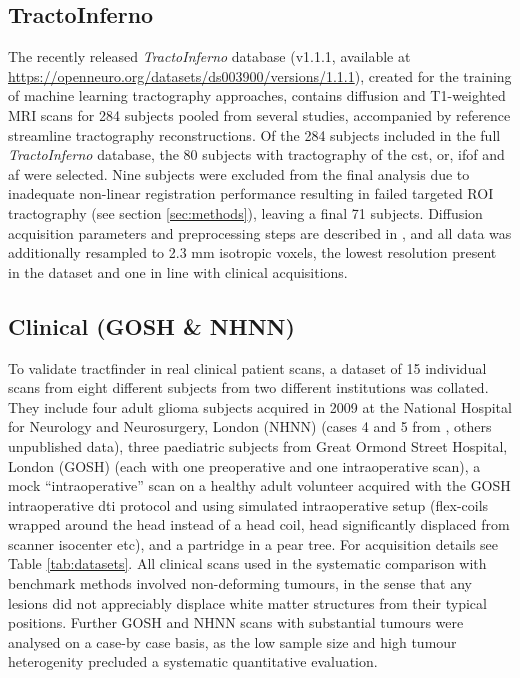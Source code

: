 \subsection{TractoInferno}

The recently released \textit{TractoInferno} database (v1.1.1, available at \url{https://openneuro.org/datasets/ds003900/versions/1.1.1}),\autocite{Poulin2022} created for the training of machine learning tractography approaches, contains diffusion and T1-weighted MRI scans for 284 subjects pooled from several studies, accompanied by reference streamline tractography reconstructions.
Of the 284 subjects included in the full \textit{TractoInferno} database, the 80 subjects with tractography of the \gls{cst}, \gls{or}, \gls{ifof} and \gls{af} were selected.
Nine subjects were excluded from the final analysis due to inadequate non-linear registration performance resulting in failed targeted ROI tractography (see section \ref{sec:methods}), leaving a final 71 subjects.
Diffusion acquisition parameters and preprocessing steps are described in \textcite{Poulin2022}, and all data was additionally resampled to 2.3 mm isotropic voxels, the lowest resolution present in the dataset and one in line with clinical acquisitions.

\subsection{Clinical (GOSH \& NHNN)}

To validate tractfinder in real clinical patient scans, a dataset of 15 individual scans from eight different subjects from two different institutions was collated.
They include four adult glioma subjects acquired in 2009 at the National Hospital for Neurology and Neurosurgery, London (NHNN) (cases 4 and 5 from \textcite{Mancini2022}, others unpublished data),
three paediatric subjects from Great Ormond Street Hospital, London (GOSH) (each with one preoperative and one intraoperative scan),
a mock “intraoperative” scan on a healthy adult volunteer acquired with the GOSH intraoperative \gls{dti} protocol and using simulated intraoperative setup (flex-coils wrapped around the head instead of a head coil, head significantly displaced from scanner isocenter etc),
and a partridge in a pear tree.
For acquisition details see Table \ref{tab:datasets}.
All clinical scans used in the systematic comparison with benchmark methods involved non-deforming tumours, in the sense that any lesions did not appreciably displace white matter structures from their typical positions.
Further GOSH and NHNN scans with substantial tumours were analysed on a case-by case basis, as the low sample size and high tumour heterogenity precluded a systematic quantitative evaluation.

